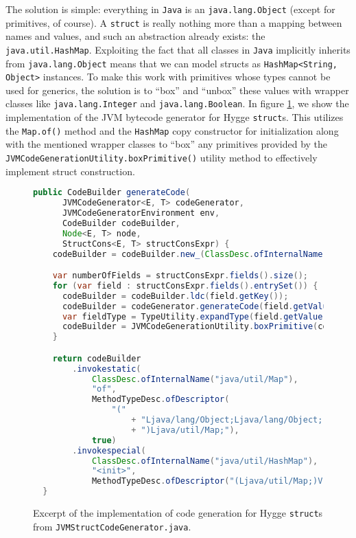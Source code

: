 The solution is simple: everything in \texttt{Java} is an \texttt{java.lang.Object}\cite{java_object} (except for primitives, of course). A \texttt{struct} is really
nothing more than a mapping between names and values, and such an abstraction already exists: the \texttt{java.util.HashMap}\cite{hashmap}.
Exploiting the fact that all classes in \texttt{Java} implicitly inherits from \texttt{java.lang.Object} means that we can
model structs as \texttt{HashMap<String, Object>} instances. To make this work with primitives whose types cannot be used for generics,
the solution is to ``box'' and ``unbox'' these values with wrapper classes like \texttt{java.lang.Integer} and \texttt{java.lang.Boolean}.
In figure \ref{fig:jvm_struct_builder}, we show the implementation of the JVM bytecode generator for Hygge \texttt{struct}s. This utilizes the \texttt{Map.of()}
method and the \texttt{HashMap} copy constructor for initialization along with the mentioned wrapper classes to ``box''
any primitives provided by the \texttt{JVMCodeGenerationUtility.boxPrimitive()} utility method to effectively implement
struct construction.

\begin{figure}[H]
  \centering
  \begin{lstlisting}[language=Java]
  public CodeBuilder generateCode(
      JVMCodeGenerator<E, T> codeGenerator,
      JVMCodeGeneratorEnvironment env,
      CodeBuilder codeBuilder,
      Node<E, T> node,
      StructCons<E, T> structConsExpr) {
    codeBuilder = codeBuilder.new_(ClassDesc.ofInternalName("java/util/HashMap")).dup();

    var numberOfFields = structConsExpr.fields().size();
    for (var field : structConsExpr.fields().entrySet()) {
      codeBuilder = codeBuilder.ldc(field.getKey());
      codeBuilder = codeGenerator.generateCode(field.getValue(), env, codeBuilder);
      var fieldType = TypeUtility.expandType(field.getValue().env(), field.getValue().type());
      codeBuilder = JVMCodeGenerationUtility.boxPrimitive(codeBuilder, fieldType);
    }

    return codeBuilder
        .invokestatic(
            ClassDesc.ofInternalName("java/util/Map"),
            "of",
            MethodTypeDesc.ofDescriptor(
                "("
                    + "Ljava/lang/Object;Ljava/lang/Object;".repeat(numberOfFields)
                    + ")Ljava/util/Map;"),
            true)
        .invokespecial(
            ClassDesc.ofInternalName("java/util/HashMap"),
            "<init>",
            MethodTypeDesc.ofDescriptor("(Ljava/util/Map;)V"));
  }
  \end{lstlisting}
  \caption{Excerpt of the implementation of code generation for Hygge \texttt{struct}s from \texttt{JVMStructCodeGenerator.java}.}
  \label{fig:jvm_struct_builder}
\end{figure}

